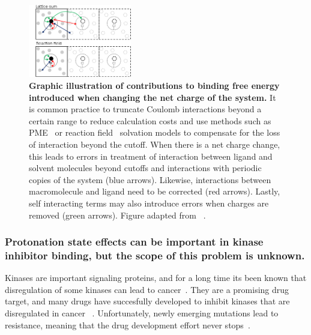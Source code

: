 \documentclass[10pt,final]{article}
\begin{document}
\begin{figure}[H]
  \centering
  \includegraphics[width=0.4\textwidth]{figures/reif_oostenbrink.png}
    \caption{\textbf{Graphic illustration of contributions to binding free energy introduced when changing the net charge of the system.}  It is common practice to truncate Coulomb interactions beyond a certain range to reduce calculation costs and use methods such as PME~\autocite{Essmann1995a} or reaction field~\autocite{Tironi1995a} solvation models to compensate for the loss of interaction beyond the cutoff. When there is a net charge change, this leads to errors in treatment of interaction between ligand and solvent molecules beyond cutoffs and interactions with periodic copies of the system (blue arrows). Likewise, interactions between macromolecule and ligand need to be corrected (red arrows). Lastly, self interacting terms may also introduce errors when charges are removed (green arrows). Figure adapted from ~\textcite{Reif2013a}.}
  \label{figure:chargecorrections}
\end{figure}

\subsubsection*{Protonation state effects can be important in kinase inhibitor binding, but the scope of this problem is unknown.}
Kinases are important signaling proteins, and for a long time its been known that disregulation of some kinases can lead to cancer~\autocite{Levinson1978a,Vivanco2002a}.
%
They are a promising drug target, and many drugs have succesfully developed to inhibit kinases that are disregulated in cancer ~\autocite{Baselga2006a,Garber2006a,OHare2011a}.
%
Unfortunately, newly emerging mutations lead to resistance, meaning that the drug development effort never stops~\autocite{Shah2004a,Pao2005a,Garber2006a,Zhang2009a}.
\end{document}
